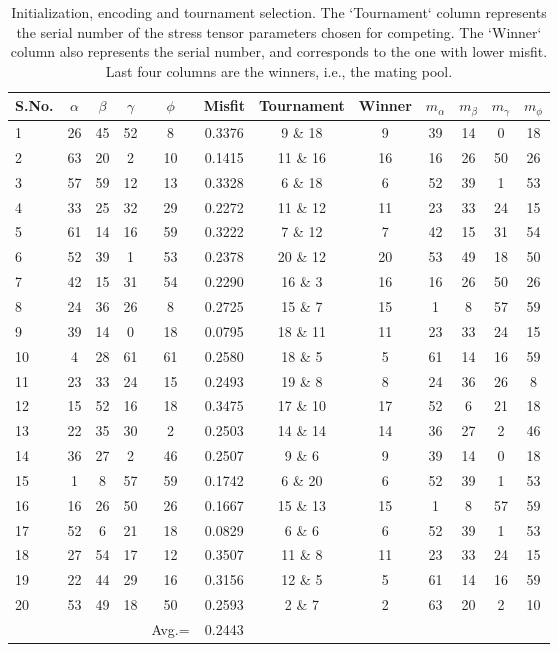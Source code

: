 \begin{table}[htb]
  \footnotesize
  \centering
   \renewcommand{\arraystretch}{1.2}
  \begin{tabular}{@{}lccccc|cccccc@{}}
    \toprule
    S.No. & $\alpha$ & $\beta$ & $\gamma$ & $\phi$ & Misfit & Tournament & Winner & $m_{\alpha}$ & $m_{\beta}$ & $m_{\gamma}$ & $m_{\phi}$ \\
    \midrule
    1 & 26 & 45 & 52 & 8 & 0.3376 & 9 \& 18 & 9 & 39 & 14 & 0 & 18 \\
    2 & 63 & 20	& 2	& 10 & 0.1415 & 11 \& 16 & 16 & 16 & 26 & 50 & 26 \\
    3 & 57 & 59 & 12 & 13 & 0.3328 & 6 \& 18 & 6 & 52 & 39 & 1 & 53 \\
    4 & 33 & 25	& 32 & 29 & 0.2272 & 11 \& 12 & 11 & 23 & 33 & 24 & 15 \\
    5 & 61 & 14	& 16 & 59 & 0.3222 & 7 \& 12 & 7 & 42 & 15 & 31 & 54 \\ 
    6 & 52 & 39	& 1 & 53 & 0.2378 & 20 \& 12 & 20 & 53 & 49 & 18 & 50 \\
    7 & 42 & 15 & 31 & 54 & 0.2290 & 16 \& 3 & 16 & 16 & 26 & 50 & 26 \\
    8 & 24 & 36 & 26 & 8 & 0.2725 & 15 \& 7 & 15 & 1 & 8 & 57 & 59 \\
    9 & 39 & 14 & 0 & 18 & 0.0795 & 18 \& 11 & 11 & 23 & 33 & 24 & 15 \\
    10 & 4 & 28 & 61 & 61 & 0.2580 & 18 \& 5 & 5 & 61 & 14 & 16 & 59 \\
    11 & 23	& 33 & 24 & 15 & 0.2493 & 19 \& 8 & 8 & 24 & 36 & 26 & 8 \\
    12 & 15	& 52 & 16 & 18 & 0.3475 & 17 \& 10 & 17 & 52 & 6 & 21 & 18 \\
    13 & 22	& 35 & 30 & 2 & 0.2503 & 14 \& 14 & 14 & 36 & 27 & 2 & 46 \\
    14 & 36	& 27 & 2 & 46 & 0.2507 & 9 \& 6	& 9 & 39 & 14 & 0 & 18 \\
    15 & 1 & 8 & 57 & 59 & 0.1742 & 6 \& 20	& 6 & 52 & 39 & 1 & 53 \\ 
    16 & 16	& 26 & 50 & 26 & 0.1667 & 15 \& 13 & 15 & 1 & 8 & 57 & 59 \\
    17 & 52	& 6 & 21 & 18 & 0.0829 & 6 \& 6 & 6 & 52 & 39 & 1 & 53 \\
    18 & 27	& 54 & 17 & 12 & 0.3507 & 11 \& 8 & 11 & 23 & 33 & 24 & 15 \\
    19 & 22	& 44 & 29 & 16 & 0.3156 & 12 \& 5 & 5 & 61 & 14 & 16 & 59 \\
    20 & 53	& 49 & 18 & 50 & 0.2593 & 2 \& 7 & 2 & 63 & 20 & 2 & 10 \\
    \cmidrule(lr){5-6}
     & & & & Avg.= & 0.2443 & & & & & & \\

    \bottomrule
  \end{tabular}
  \caption{Initialization, encoding and tournament selection. The `Tournament` column represents the serial number of the stress tensor parameters chosen for competing. The `Winner` column also represents the serial number, and corresponds to the one with lower misfit. Last four columns are the winners, i.e., the mating pool.}\label{table:4}
\end{table}

